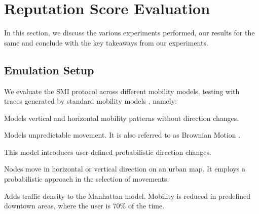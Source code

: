 \documentclass[letterpaper,twocolumn]{sig-alternate}
\begin{document}
 \section{Reputation Score Evaluation}
\label{eval}

In this section, we discuss the various experiments performed, our results for the same and conclude with the key takeaways from our experiments. 


\subsection{Emulation Setup}
\label{setup}

We evaluate the SMI protocol across different mobility models, testing with traces generated by standard mobility models \cite{smooth,citymob}, namely:

\vspace{1mm}
 Models vertical and horizontal mobility patterns without direction changes.

\vspace{1mm}
 Models unpredictable movement. It is also referred to as Brownian Motion \cite{hida1980brownian}.

\vspace{1mm}
 This model introduces user-defined probabilistic direction changes.

\vspace{1mm}
 Nodes move in horizontal or vertical direction on an urban map. It employs a probabilistic approach in the selection of movements. 

\vspace{1mm}
 Adds traffic density to the Manhattan model. Mobility is reduced in predefined downtown areas, where the user is 70\% of the time.
\end{document}

